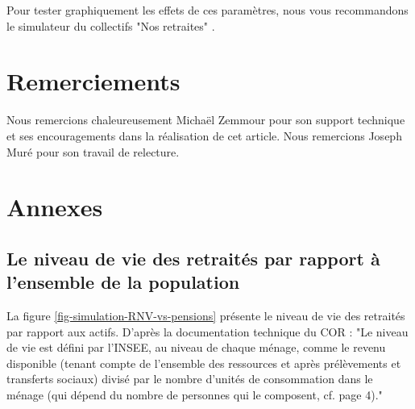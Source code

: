 \documentclass[10pt]{article}
\begin{document}
Pour tester graphiquement les effets de ces paramètres, nous vous recommandons le 
simulateur du collectifs "Nos retraites" \cite{SimulateurNoRetraites}. 


\section{Remerciements}

Nous remercions chaleureusement Michaël Zemmour pour son support 
technique et ses encouragements dans la réalisation de cet article. 
Nous remercions Joseph Muré pour son travail de relecture. 





\section{Annexes}

\subsection{Le niveau de vie des retraités par rapport à l'ensemble de la population}

La figure \ref{fig-simulation-RNV-vs-pensions} présente 
le niveau de vie des retraités par rapport aux actifs. 
D'après la documentation technique du COR : "Le niveau de vie est défini 
par l’INSEE, au niveau de chaque ménage, comme le revenu disponible (tenant
compte de l’ensemble des ressources et après prélèvements et transferts sociaux) 
divisé par le nombre d’unités de consommation dans le ménage 
(qui dépend du nombre de personnes qui le composent, cf. page 4)."
\end{document}
